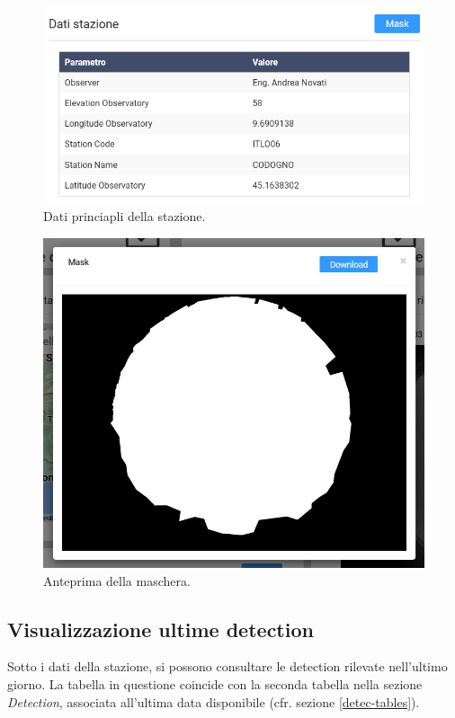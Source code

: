 \begin{figure}[H]
    \begin{center}
    \includegraphics[width=\textwidth]{images/dati-stazione.png}
    \caption{Dati princiapli della stazione.}
    \end{center}
\end{figure}
\begin{figure}[H]
    \includegraphics[width=\textwidth]{images/mask.jpg}
    \caption{Anteprima della maschera.}
\end{figure}

\subsection{Visualizzazione ultime detection}

Sotto i dati della stazione, si possono consultare le detection rilevate nell'ultimo giorno. La tabella in questione coincide con la seconda tabella nella sezione \emph{Detection}, associata all'ultima data disponibile (cfr. sezione \ref{detec-tables}).

